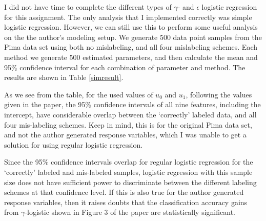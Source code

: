 \documentclass{article}
\begin{document}
I did not have time to complete the different types of $\gamma$- and $\epsilon$ logistic regression for this assignment. The only analysis that I implemented correctly was simple logistic regression. However, we can still use this to perform some useful analysis on the the author's modeling setup. We generate 500 data point samples from the Pima data set using both no mislabeling, and all four mislabeling schemes. Each method we generate 500 estimated parameters, and then calculate the mean and 95\% confidence interval for each combination of parameter and method. The results are shown in Table \ref{simresult}.

As we see from the table, for the used values of $u_0$ and $u_1$, following the values given in the paper, the 95\% confidence intervals of all nine features, including the intercept, have considerable overlap between the `correctly' labeled data, and all four mis-labeling schemes. Keep in mind, this is for the original Pima data set, and not the author generated response variables, which I was unable to get a solution for using regular logistic regression.

Since the 95\% confidence intervals overlap for regular logistic regression for the `correctly' labeled and mis-labeled samples, logistic regression with this sample size does not have sufficient power to discriminate between the different labeling schemes at that confidence level. If this is also true for the author generated response variables, then it raises doubts that the classification accuracy gains from $\gamma$-logistic shown in Figure 3 of the paper are statistically significant. 
\end{document}
